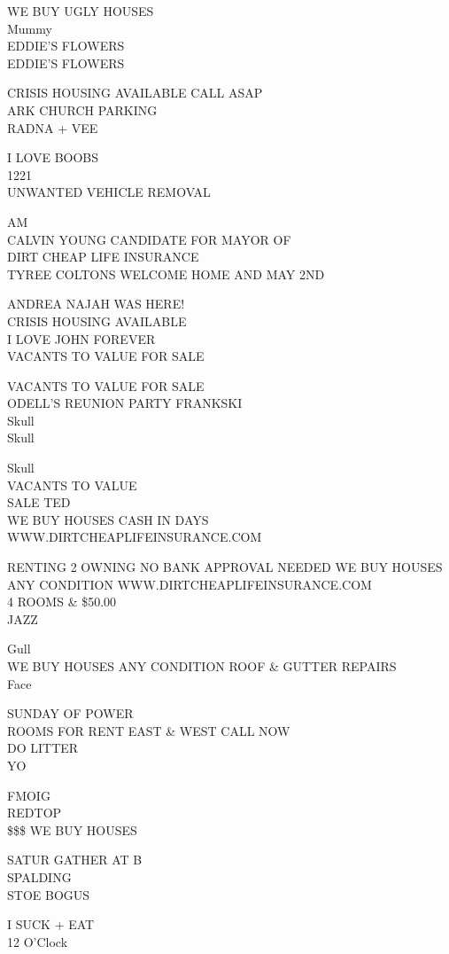 \documentclass[10pt,letterpaper]{article}
\begin{document}
WE BUY UGLY HOUSES\\
Mummy\\
EDDIE'S FLOWERS\\
EDDIE'S FLOWERS

CRISIS HOUSING AVAILABLE CALL ASAP\\
ARK CHURCH PARKING\\
RADNA + VEE

I LOVE BOOBS\\
1221\\
UNWANTED VEHICLE REMOVAL

AM\\
CALVIN YOUNG CANDIDATE FOR MAYOR OF\\
DIRT CHEAP LIFE INSURANCE\\
TYREE COLTONS WELCOME HOME AND MAY 2ND

ANDREA NAJAH WAS HERE!\\
CRISIS HOUSING AVAILABLE\\
I LOVE JOHN FOREVER\\
VACANTS TO VALUE FOR SALE

VACANTS TO VALUE FOR SALE\\
ODELL'S REUNION PARTY FRANKSKI\\
Skull\\
Skull

Skull\\
VACANTS TO VALUE\\
SALE TED\\
WE BUY HOUSES CASH IN DAYS WWW.DIRTCHEAPLIFEINSURANCE.COM

RENTING 2 OWNING NO BANK APPROVAL NEEDED WE BUY HOUSES ANY CONDITION WWW.DIRTCHEAPLIFEINSURANCE.COM\\
4 ROOMS \& \$50.00\\
JAZZ

Gull\\
WE BUY HOUSES ANY CONDITION ROOF \& GUTTER REPAIRS\\
Face

SUNDAY OF POWER\\
ROOMS FOR RENT EAST \& WEST CALL NOW\\
DO LITTER\\
YO

FMOIG\\
REDTOP\\
\$\$\$ WE BUY HOUSES

SATUR GATHER AT B\\
SPALDING\\
STOE BOGUS

I SUCK + EAT\\
12 O'Clock
\end{document}
